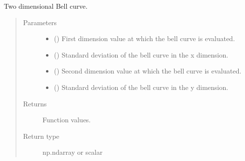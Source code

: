 \documentclass[letterpaper,10pt,english]{sphinxmanual}
\begin{document}
\begin{fulllineitems}
\label{\detokenize{qsim:qsim.noise.bell_curve_2dim}}
Two dimensional Bell curve.
\begin{quote}\begin{description}
\item[{Parameters}] \leavevmode\begin{itemize}
\item {} 
 () \textendash{} First dimension value at which the bell curve is evaluated.

\item {} 
 () \textendash{} Standard deviation of the bell curve in the x dimension.

\item {} 
 () \textendash{} Second dimension value at which the bell curve is evaluated.

\item {} 
 () \textendash{} Standard deviation of the bell curve in the y dimension.

\end{itemize}

\item[{Returns}] \leavevmode
{} \textendash{} Function values.

\item[{Return type}] \leavevmode
np.ndarray or scalar

\end{description}\end{quote}

\end{fulllineitems}
\end{document}
